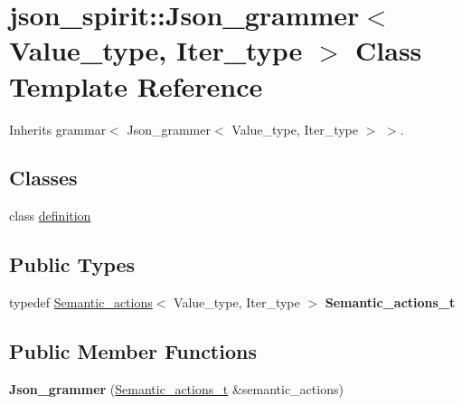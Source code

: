 \hypertarget{classjson__spirit_1_1_json__grammer}{}\section{json\+\_\+spirit\+::Json\+\_\+grammer$<$ Value\+\_\+type, Iter\+\_\+type $>$ Class Template Reference}
\label{classjson__spirit_1_1_json__grammer}


Inherits grammar$<$ Json\+\_\+grammer$<$ Value\+\_\+type, Iter\+\_\+type $>$ $>$.

\subsection*{Classes}
\begin{DoxyCompactItemize}
\item 
class \mbox{\hyperlink{classjson__spirit_1_1_json__grammer_1_1definition}{definition}}
\end{DoxyCompactItemize}
\subsection*{Public Types}
\begin{DoxyCompactItemize}
\item 
\mbox{\label{classjson__spirit_1_1_json__grammer_af002d620720009cf1d1a8b7bdebcd704}} 
typedef \mbox{\hyperlink{classjson__spirit_1_1_semantic__actions}{Semantic\+\_\+actions}}$<$ Value\+\_\+type, Iter\+\_\+type $>$ {\bfseries Semantic\+\_\+actions\+\_\+t}
\end{DoxyCompactItemize}
\subsection*{Public Member Functions}
\begin{DoxyCompactItemize}
\item 
\mbox{\label{classjson__spirit_1_1_json__grammer_a366061eedf4a7f49161418491c09aa9d}} 
{\bfseries Json\+\_\+grammer} (\mbox{\hyperlink{classjson__spirit_1_1_semantic__actions}{Semantic\+\_\+actions\+\_\+t}} \&semantic\+\_\+actions)
\end{DoxyCompactItemize}
